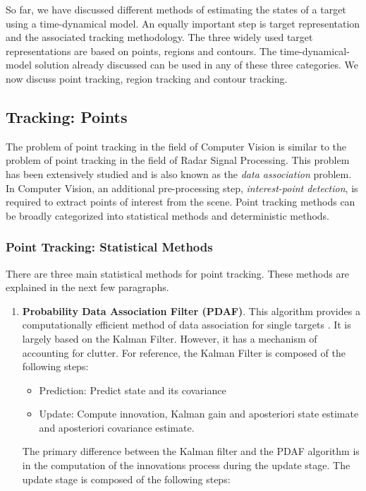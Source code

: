 \documentclass[12pt,letterpaper,doublespaced,ETD,proposal]{gt-ece-thesis}
\begin{document}
\begin{Body}
So far, we have discussed different methods of estimating the states of a target using a time-dynamical model.  An equally important step is target representation and the associated tracking methodology.  The three widely used target representations are based on points, regions and contours.  The time-dynamical-model solution already discussed can be used in any of these three categories.  We now discuss point tracking, region tracking and contour tracking.

\subsection{Tracking: Points}
The problem of point tracking in the field of Computer Vision is similar to the problem of point tracking in the field of Radar Signal Processing.  This problem has been extensively studied and is also known as the \emph{data association} problem.  In Computer Vision, an additional pre-processing step, \emph{interest-point detection}, is required to extract points of interest from the scene.  Point tracking methods can be broadly categorized into statistical methods and deterministic methods.

\subsubsection{Point Tracking: Statistical Methods}
There are three main statistical methods for point tracking.  These methods are explained in the next few paragraphs.

\begin{enumerate}
\item \textbf{Probability Data Association Filter (PDAF)}.
This algorithm provides a computationally efficient method of data association for single targets \cite{1975_JNL_PDAF_BarShalom}.  It is largely based on the Kalman Filter.  However, it has a mechanism of accounting for clutter.  For reference, the Kalman Filter is composed of the following steps: 

\begin{itemize}
\item Prediction: Predict state and its covariance 
\item Update: Compute innovation, Kalman gain and aposteriori state estimate and aposteriori covariance estimate.  
\end{itemize}

The primary difference between the Kalman filter and the PDAF algorithm is in the computation of the innovations process during the update stage.  The update stage is composed of the following steps:


\end{enumerate}
\end{Body}
\end{document}
